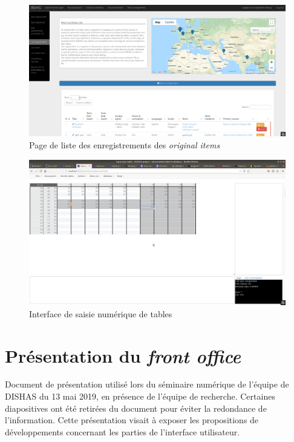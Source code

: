 \documentclass[a4paper,12pt,twoside]{book}
\newcommand{\clearemptydoublepage}{\newpage{\pagestyle{empty}\cleardoublepage}}
\newcommand{\eng}{\emph}
\newcommand{\ois}{\eng{original items}\xspace}
\begin{document}
	\begin{figure}[h!]
		\centering
		\includegraphics[width=17cm]{Annexes/Captures_ecrans/Interface_administrateur/List-Original_items.png}
		\caption{Page de liste des enregistrements des \ois}
	\end{figure}

	\begin{figure}[h!]
		\centering
		\includegraphics[width=17cm]{Annexes/Captures_ecrans/Interface_administrateur/DISHAS_Table_Interface.png}
		\caption{Interface de saisie numérique de tables}
	\end{figure}

\clearemptydoublepage

	\chapter{\label{PresentationSeminaire}Présentation du \eng{front office}}
	Document de présentation utilisé lors du séminaire numérique de l'équipe de DISHAS du 13 mai 2019, en présence de l'équipe de recherche. Certaines diapositives ont été retirées du document pour éviter la redondance de l'information. Cette présentation visait à exposer les propositions de développements concernant les parties de l'interface utilisateur.
	
\end{document}
